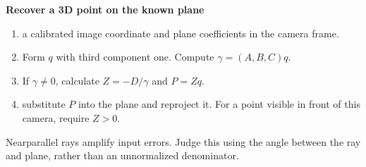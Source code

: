 \documentclass[letterpaper,11pt,english,openany,oneside]{jupyterBook}
\begin{document}
\begin{TextbookBox}
\textbf{Recover a 3D point on the known plane}\par\smallskip
\begin{enumerate}
%
\item {}
\sphinxAtStartPar
{} a calibrated image coordinate and plane coefficients in the camera frame.

\item {}
\sphinxAtStartPar
Form \(q\) with third component one. Compute \(\gamma=(A,B,C)q\).

\item {}
\sphinxAtStartPar
If \(\gamma\ne0\), calculate \(Z=-D/\gamma\) and \(P=Zq\).

\item {}
\sphinxAtStartPar
{} substitute \(P\) into the plane and reproject it. For a point visible in front of this camera, require \(Z>0\).

\end{enumerate}

\sphinxAtStartPar
Near\sphinxhyphen{}parallel rays amplify input errors. Judge this using the angle between the ray and plane, rather than an unnormalized denominator.

\end{TextbookBox}
\end{document}
